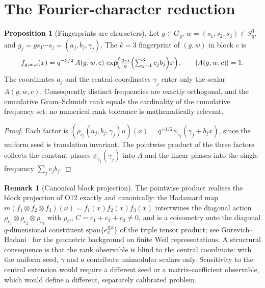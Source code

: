 \documentclass[11pt,a4paper]{article}
\theoremstyle{plain}
\theoremstyle{definition}
\newtheorem{proposition}{Proposition}
\newtheorem{remark}{Remark}
\begin{document}
  \section{The Fourier-character reduction}
    \label{sec:fourier}

    \begin{proposition}[Fingerprints are characters]
      \label{prop:character}
      Let $g \in G_q$, $w = (s_1,s_2,s_3) \in S_q^3$, and $g_j = g s_1 \cdots s_j =
      (a_j, b_j, \gamma_j)$.
      The $k=3$ fingerprint of $(g,w)$ in block $c$ is
      \begin{equation}
        f_{g,w,c}(x)
        = q^{-3/2}\,A(g,w,c)\,
          \exp\!\Bigl(\tfrac{2\pi i}{q}\Bigl(\textstyle\sum_{j=1}^{3}c_j b_j\Bigr)x\Bigr),
        \qquad \lvert A(g,w,c)\rvert = 1.
        \label{eq:character}
      \end{equation}
      The coordinates $a_j$ and the central coordinates $\gamma_j$ enter only the scalar
      $A(g,w,c)$.
      Consequently distinct frequencies are exactly orthogonal, and the cumulative Gram--Schmidt
      rank equals the cardinality of the cumulative frequency set: no numerical rank tolerance is
      mathematically relevant.
    \end{proposition}

    \begin{proof}
      Each factor is $(\rho_{c_j}(a_j,b_j,\gamma_j)u)(x) = q^{-1/2}\psi_{c_j}(\gamma_j + b_j x)$,
      since the uniform seed is translation invariant.
      The pointwise product of the three factors collects the constant phases
      $\psi_{c_j}(\gamma_j)$ into $A$ and the linear phases into the single frequency
      $\sum_j c_j b_j$.
    \end{proof}

    \begin{remark}[Canonical block projection]
      \label{rem:projection}
      The pointwise product realises the block projection of O12 exactly and canonically: the
      Hadamard map $m(f_1 \otimes f_2 \otimes f_3)(x) = f_1(x)f_2(x)f_3(x)$ intertwines the
      diagonal action $\rho_{c_1} \otimes \rho_{c_2} \otimes \rho_{c_3}$ with $\rho_{C}$,
      $C = c_1+c_2+c_3 \ne 0$, and is a coisometry onto the diagonal $q$-dimensional constituent
      $\mathrm{span}\{e_x^{\otimes 3}\}$ of the triple tensor product; see
      Gurevich--Hadani~\cite{GurevichHadani2007} for the geometric background on finite Weil
      representations.
      A structural consequence is that the rank observable is blind to the central coordinate: with
      the uniform seed, $\gamma$ and $a$ contribute unimodular scalars only.
      Sensitivity to the central extension would require a different seed or a matrix-coefficient
      observable, which would define a different, separately calibrated problem.
    \end{remark}
\end{document}
